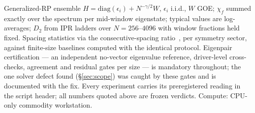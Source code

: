 \documentclass[11pt]{article}
\newcommand{\chif}{\chi_{f}}
\begin{document}
Generalized-RP ensemble $H = \mathrm{diag}(\epsilon_i) + N^{-\gamma/2}W$, $\epsilon_i$ i.i.d.,
$W$ GOE; $\chif$ summed exactly over the spectrum per mid-window eigenstate; typical values are
log-averages; $D_2$ from IPR ladders over $N = 256$--$4096$ with window fractions held fixed.
Spacing statistics via the consecutive-spacing ratio~\cite{atas2013,oganesyan2007}, per symmetry
sector, against finite-size baselines computed with the identical protocol. Eigenpair
certification --- an independent no-vector eigenvalue reference, driver-level cross-checks,
agreement and residual gates per size --- is mandatory throughout; the one solver defect found
(\S\ref{sec:scope}) was caught by these gates and is documented with the fix. Every experiment
carries its preregistered reading in the script header; all numbers quoted above are frozen
verdicts. Compute: CPU-only commodity workstation.
\end{document}
